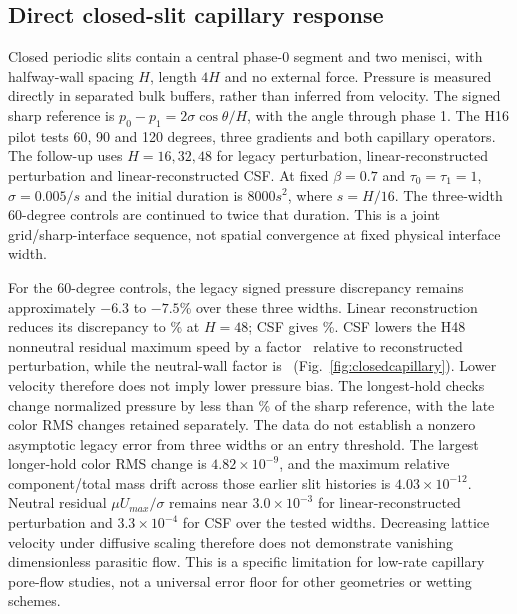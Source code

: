 \subsection{Direct closed-slit capillary response}
Closed periodic slits contain a central phase-0 segment and two menisci, with
halfway-wall spacing $H$, length $4H$ and no external force. Pressure is
measured directly in separated bulk buffers, rather than inferred from
velocity. The signed sharp reference is
$p_0-p_1=2\sigma\cos\theta/H$, with the angle through phase 1.
The H16 pilot tests 60, 90 and 120 degrees, three gradients and both capillary
operators. The follow-up uses $H=16,32,48$ for legacy perturbation,
linear-reconstructed perturbation and linear-reconstructed CSF.
At fixed $\beta=0.7$ and $\tau_0=\tau_1=1$, $\sigma=0.005/s$ and the initial
duration is $8000s^2$, where $s=H/16$. The three-width 60-degree controls
are continued to twice that duration. This is a joint grid/sharp-interface sequence, not
spatial convergence at fixed physical interface width.


For the 60-degree controls, the legacy signed pressure discrepancy remains
approximately $-6.3$ to $-7.5$\% over these three widths. Linear
reconstruction reduces its discrepancy to \CapillaryRenPressureErrorFine\%
at $H=48$; CSF gives \CapillaryCSFPressureErrorFine\%.
CSF lowers the H48 nonneutral residual maximum speed by a factor
\CapillaryNonneutralReductionFine\ relative to reconstructed perturbation,
while the neutral-wall factor is \CapillaryNeutralReductionFine\
(Fig.~\ref{fig:closedcapillary}). Lower velocity therefore does not imply
lower pressure bias. The longest-hold checks change normalized pressure by
less than \CapillaryHoldPressureChange\% of the sharp reference, with the
late color RMS changes retained separately. The data do not establish a
nonzero asymptotic legacy error from three widths or an entry threshold.
The largest longer-hold color RMS change is $4.82\times10^{-9}$, and the
maximum relative component/total mass drift across those earlier slit histories is
$4.03\times10^{-12}$.
Neutral residual $\mu U_{max}/\sigma$ remains near $3.0\times10^{-3}$ for
linear-reconstructed perturbation and $3.3\times10^{-4}$ for CSF over the
tested widths. Decreasing lattice velocity under diffusive scaling therefore
does not demonstrate vanishing dimensionless parasitic flow. This is a
specific limitation for low-rate capillary pore-flow studies, not a universal
error floor for other geometries or wetting schemes.

